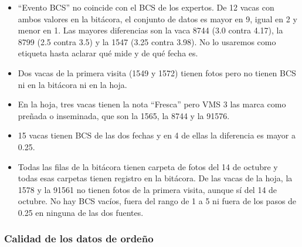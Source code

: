 \begin{itemize}
  \item ``Evento BCS'' no coincide con el BCS de los expertos. De 12 vacas con ambos valores en la bitácora, el conjunto de datos es mayor en 9, igual en 2 y menor en 1. Las mayores diferencias son la vaca 8744 (3.0 contra 4.17), la 8799 (2.5 contra 3.5) y la 1547 (3.25 contra 3.98). No lo usaremos como etiqueta hasta aclarar qué mide y de qué fecha es.
  \item Dos vacas de la primera visita (1549 y 1572) tienen fotos pero no tienen BCS ni en la bitácora ni en la hoja.
  \item En la hoja, tres vacas tienen la nota ``Fresca'' pero VMS 3 las marca como preñada o inseminada, que son la 1565, la 8744 y la 91576.
  \item 15 vacas tienen BCS de las dos fechas y en 4 de ellas la diferencia es mayor a 0.25.
  \item Todas las filas de la bitácora tienen carpeta de fotos del 14 de octubre y todas esas carpetas tienen registro en la bitácora. De las vacas de la hoja, la 1578 y la 91561 no tienen fotos de la primera visita, aunque sí del 14 de octubre. No hay BCS vacíos, fuera del rango de 1 a 5 ni fuera de los pasos de 0.25 en ninguna de las dos fuentes.
\end{itemize}

\subsubsection*{Calidad de los datos de ordeño}

